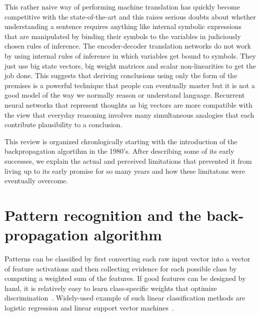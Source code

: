 \documentclass[]{article}
\begin{document}
This rather naive way of performing machine translation has quickly become competitive with the state-of-the-art and
this raises serious doubts about whether understanding a sentence requires anything like internal symbolic expressions
that are manipulated by binding their symbols to the variables in judiciously chosen rules of inference.  The
encoder-decoder translation networks do not work by using internal rules of inference in which variables get bound to
symbols. They just use big state vectors, big weight matrices and scalar non-linearities to get the job done.  This
suggests that deriving conclusions using only the form of the premises is a powerful technique that people can
eventually master but it is not a good model of the way we normally reason or understand language. Recurrent neural
networks that represent thoughts as big vectors are more compatible with the view that everyday reasoning involves many
simultaneous analogies that each contribute plausibility to a conclusion\cite{metaphors}.

This review is organized chronlogically starting with the introduction of the backpropagation algortihm in the
1980's. After describing some of its early successes, we explain the actual and perceived limitations that prevented it
from living up to its early promise for so many years and how these limitatons were eventually overcome.

\section{Pattern recognition and the back-propagation algorithm}

Patterns can be classified by first converting each raw input vector into a vector of feature activations and then
collecting evidence for each possible class by computing a weighted sum of the features. If good features can be
designed by hand, it is relatively easy to learn class-specific weights that optimize
discrimination~\cite{perceptrons}. Widely-used example of such linear classification methods are logistic
 regression and linear support vector machines~\cite{logisticregression,svm}.
\end{document}
